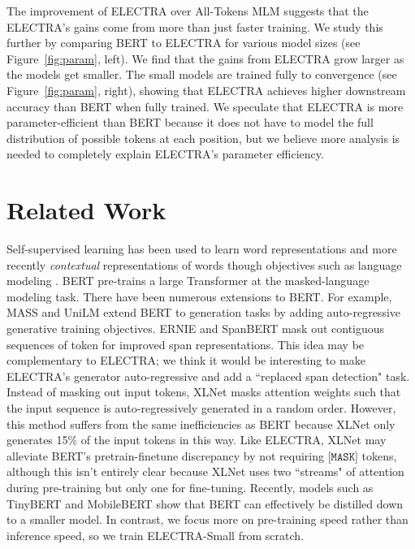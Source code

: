 \documentclass{article}
\newcommand{\xhdr}[1]{\vspace{0mm}\noindent{{\bf #1}}\hspace{1.3mm}}
\begin{document}
The improvement of ELECTRA over All-Tokens MLM suggests that the ELECTRA's gains come from more than just faster training.  
We study this further by comparing BERT to ELECTRA for various model sizes (see Figure~\ref{fig:param}, left).
We find that the gains from ELECTRA grow larger as the models get smaller.
The small models are trained fully to convergence (see Figure~\ref{fig:param}, right), showing that ELECTRA achieves higher downstream accuracy than BERT when fully trained. 
We speculate that ELECTRA is more parameter-efficient than BERT because it does not have to model the full distribution of possible tokens at each position, but we believe more analysis is needed to completely explain ELECTRA's parameter efficiency. 



\section{Related Work}

\xhdr{Self-Supervised Pre-training for NLP} 
Self-supervised learning has been used to learn word representations \citep{Collobert2011NaturalLP,pennington2014glove} and more recently {\it contextual} representations of words though objectives such as language modeling \citep{dai2015semi,peters2018deep,howard2018universal}.
BERT \citep{devlin2018bert} pre-trains a large Transformer \citep{Vaswani2017AttentionIA} at the masked-language modeling 
task.
There have been numerous extensions to BERT.
For example, MASS \citep{song2019mass} and UniLM \citep{dong2019unified} extend BERT to generation tasks by adding auto-regressive generative training objectives. 
ERNIE \citep{sun2019ernie} and SpanBERT \citep{joshi2019spanbert} mask out contiguous sequences of token for improved span representations.
This idea may be complementary to ELECTRA; we think it would be interesting to make ELECTRA's generator auto-regressive and add a ``replaced span detection" task.
Instead of masking out input tokens, XLNet \citep{yang2019xlnet} masks attention weights such that the input sequence is auto-regressively generated in a random order. However, this method suffers from the same inefficiencies as BERT because XLNet only generates 15\% of the input tokens in this way.
Like ELECTRA, XLNet may alleviate BERT's pretrain-finetune discrepancy by not requiring $\texttt{[MASK]}$ tokens, although this isn't entirely clear because XLNet uses two ``streams" of attention during pre-training but only one for fine-tuning.
Recently, models such as TinyBERT \citep{jiao2019tinybert} and MobileBERT \citep{sunmobilebert} show that BERT can effectively be distilled down to a smaller model.
In contrast, we focus more on pre-training speed rather than inference speed, so we train ELECTRA-Small from scratch.
\end{document}
